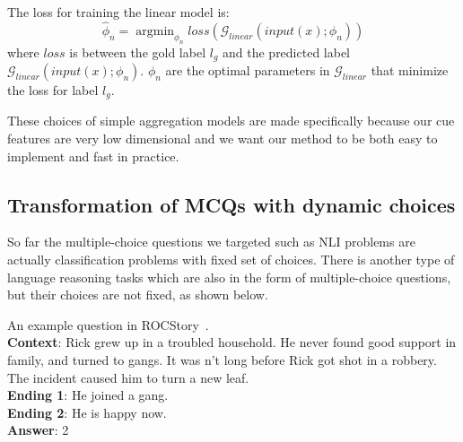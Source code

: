 The loss for training the linear model is:
 \begin{equation}
  \hat{\phi}_{n} = \mathop{\arg\min}_{\phi_n}{loss({\mathcal{G}_{linear}(input(x);\phi_n)})}
\end{equation}
where $loss$ is between the
gold label $l_g$ and the predicted label $\mathcal{G}_{linear}(input(x);\phi_n)$.
$\phi_n$ are the optimal
parameters in $\mathcal{G}_{linear}$ that minimize the loss for label $l_g$. 

These choices of simple aggregation models are made specifically because
our cue features are very low dimensional and we want our method to be both
easy to implement and fast in practice.

\subsection{Transformation of MCQs with dynamic choices}
\label{sec:dynamic}
So far the multiple-choice questions we targeted such as NLI problems
are actually classification problems with fixed set of choices. There is
another type of language reasoning tasks which are also in the form of
multiple-choice questions, but their choices are not fixed, as shown
below. 
\begin{example}\label{exp:roc}
An example question in ROCStory~\cite{mostafazadeh2016corpus}.\\

\noindent
\textbf{Context}: Rick grew up in a troubled household. 
He never found good support in family, and turned to gangs.           
It was n't long before Rick got shot in a robbery.             
The incident caused him to turn a new leaf.\\

\noindent
\textbf{Ending 1}: He joined a gang. \\

\noindent
\textbf{Ending 2}:  He is happy now.\\

\noindent
\textbf{Answer}: 2
\end{example}

